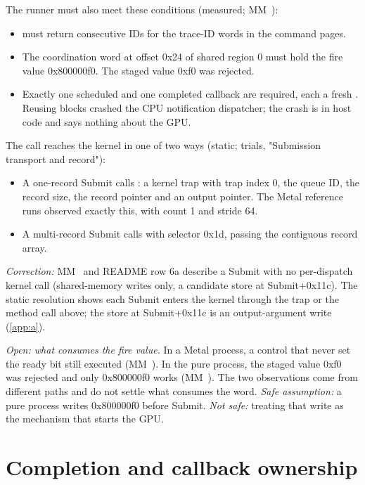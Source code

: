 The runner must also meet these conditions (measured; MM~):

\begin{itemize}
\item {} must return consecutive IDs for the trace-ID words in the command pages.
\item The coordination word at offset 0x24 of shared region 0 must hold the fire value 0x800000f0. The staged value 0xf0 was
  rejected.
\item Exactly one scheduled and one completed callback are required, each a fresh . Reusing blocks crashed the
  CPU notification dispatcher; the crash is in host code and says nothing about the GPU.
\end{itemize}

The call reaches the kernel in one of two ways (static; trials, "Submission transport and record"):

\begin{itemize}
\item A one-record Submit calls : a kernel trap with trap index 0, the queue ID, the record size, the record
  pointer and an output pointer. The Metal reference runs observed exactly this, with count 1 and stride 64.
\item A multi-record Submit calls  with selector 0x1d, passing the contiguous record array.
\end{itemize}

\emph{Correction:} MM~ and README row 6a describe a Submit with no per-dispatch kernel call (shared-memory writes
only, a candidate store at Submit+0x11c). The static resolution shows each Submit enters the kernel through the trap
or the method call above; the store at Submit+0x11c is an output-argument write (\cref{app:a}).

\emph{Open: what consumes the fire value.} In a Metal process, a control that never set the ready bit still executed
(MM~). In the pure process, the staged value 0xf0 was rejected and only 0x800000f0 works (MM~). The two
observations come from different paths and do not settle what consumes the word. \emph{Safe assumption:} a pure process
writes 0x800000f0 before Submit. \emph{Not safe:} treating that write as the mechanism that starts the GPU.

\section{Completion and callback ownership}\label{sec:completion-callbacks-their}

